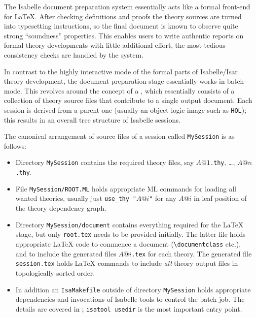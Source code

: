 \begin{isabellebody}
\begin{isamarkuptext}
  \medskip The Isabelle document preparation system essentially acts
  like a formal front-end for {\LaTeX}.  After checking definitions
  and proofs the theory sources are turned into typesetting
  instructions, so the final document is known to observe quite strong
  ``soundness'' properties.  This enables users to write authentic
  reports on formal theory developments with little additional effort,
  the most tedious consistency checks are handled by the system.%
\end{isamarkuptext}%
\isamarkuptrue%
%
\isamarkuptrue%
%
\begin{isamarkuptext}%
In contrast to the highly interactive mode of the formal parts of
  Isabelle/Isar theory development, the document preparation stage
  essentially works in batch-mode.  This revolves around the concept
  of a , which essentially consists of a collection
  of theory source files that contribute to a single output document.
  Each session is derived from a parent one (usually an object-logic
  image such as \texttt{HOL}); this results in an overall tree
  structure of Isabelle sessions.

  The canonical arrangement of source files of a session called
  \texttt{MySession} is as follows:

  \begin{itemize}

  \item Directory \texttt{MySession} contains the required theory
  files, say $A@1$\texttt{.thy}, \dots, $A@n$\texttt{.thy}.

  \item File \texttt{MySession/ROOT.ML} holds appropriate ML commands
  for loading all wanted theories, usually just
  \texttt{use_thy~"$A@i$"} for any $A@i$ in leaf position of the
  theory dependency graph.

  \item Directory \texttt{MySession/document} contains everything
  required for the {\LaTeX} stage, but only \texttt{root.tex} needs to
  be provided initially.  The latter file holds appropriate {\LaTeX}
  code to commence a document (\verb,\documentclass, etc.), and to
  include the generated files $A@i$\texttt{.tex} for each theory.  The
  generated file \texttt{session.tex} holds {\LaTeX} commands to
  include \emph{all} theory output files in topologically sorted
  order.

  \item In addition an \texttt{IsaMakefile} outside of directory
  \texttt{MySession} holds appropriate dependencies and invocations of
  Isabelle tools to control the batch job.  The details are covered in
  \cite{isabelle-sys}; \texttt{isatool usedir} is the most important
  entry point.


\end{itemize}
\end{isamarkuptext}
\end{isabellebody}
